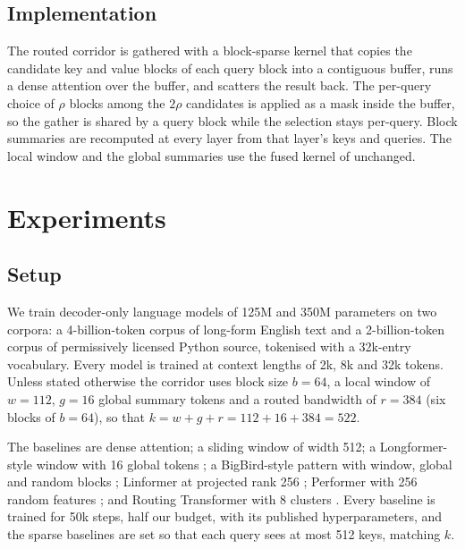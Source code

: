 \documentclass[11pt]{article}
\begin{document}
\subsection{Implementation}\label{sec:impl}

The routed corridor is gathered with a block-sparse kernel that copies the
candidate key and value blocks of each query block into a contiguous buffer,
runs a dense attention over the buffer, and scatters the result back. The
per-query choice of $\rho$ blocks among the $2\rho$ candidates is applied as
a mask inside the buffer, so the gather is shared by a query block while the
selection stays per-query. Block summaries are recomputed at every layer
from that layer's keys and queries. The local window and the global
summaries use the fused kernel of \citet{dao2022flashattention} unchanged.

\section{Experiments}\label{sec:experiments}

\subsection{Setup}\label{sec:setup}

We train decoder-only language models of 125M and 350M parameters on two
corpora: a 4-billion-token corpus of long-form English text and a
2-billion-token corpus of permissively licensed Python source, tokenised
with a 32k-entry vocabulary. Every model is trained at context lengths of
2k, 8k and 32k tokens. Unless stated otherwise the corridor uses block size
$b = 64$, a local window of $w = 112$, $g = 16$ global summary tokens and a
routed bandwidth of $r = 384$ (six blocks of $b = 64$), so that
$k = w + g + r = 112 + 16 + 384 = 522$.

The baselines are dense attention; a sliding window of width 512; a
Longformer-style window with 16 global tokens \citep{beltagy2020longformer};
a BigBird-style pattern with window, global and random blocks
\citep{zaheer2020bigbird}; Linformer at projected rank 256
\citep{wang2020linformer}; Performer with 256 random features
\citep{choromanski2021performer}; and Routing Transformer with 8 clusters
\citep{roy2021efficient}. Every baseline is trained for 50k steps, half our
budget, with its published hyperparameters, and the sparse baselines are set
so that each query sees at most 512 keys, matching $k$.
\end{document}
